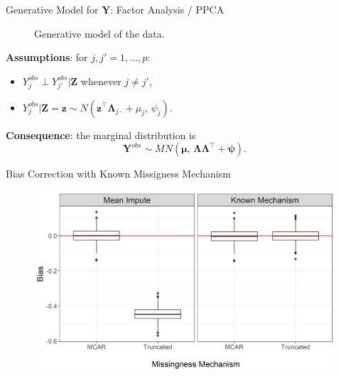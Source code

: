 \documentclass[aspectratio=169,xcolor=dvipsnames]{beamer}
\begin{document}
\begin{frame}{Generative Model for $\bm Y$: Factor Analysis / PPCA}
\noindent\begin{minipage}[t]{0.48\linewidth}
    \begin{figure}
    \caption{Generative model of the data.}
    \end{figure}
\end{minipage}
\fontsize{10pt}{10}\selectfont
\noindent\begin{minipage}[t]{0.48\linewidth}
\vspace{1cm}
\noindent \textbf{Assumptions}: for $j, j' =1, \dots, p$:
\vspace{.5cm}
\begin{itemize}
    \item $Y_j^{obs} \perp Y_{j'}^{obs}|\boldsymbol Z$ whenever $j\neq j'$,
    \item $Y_j^{obs}|\boldsymbol Z = \boldsymbol z \sim N(\boldsymbol z^\top \boldsymbol \Lambda_{j\cdot} + \mu_j,\, \psi_j)$.
\end{itemize}
\vspace{1cm}
\textbf{Consequence}: the marginal distribution is
    $$\boldsymbol Y^{obs} \sim MN(\boldsymbol \mu,\, \boldsymbol \Lambda \boldsymbol \Lambda^\top  + \boldsymbol \psi).$$
\end{minipage}
\end{frame}

\begin{frame}{Bias Correction with Known Missigness Mechanism}
    \begin{figure}
        \centering
        \includegraphics[width=.75\textwidth]{images/plot_bias_2.jpg}
    \end{figure}
\end{frame}
\end{document}
